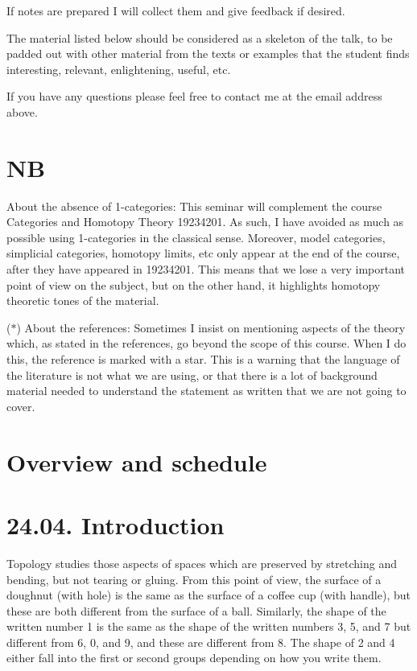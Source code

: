 \documentclass[a4paper]{amsart}
\numberwithin{figure}{section}
\theoremstyle{theorem}
\theoremstyle{definition}
\begin{document}
If notes are prepared I will collect them and give feedback if desired.

The material listed below should be considered as a skeleton of the talk, to be padded out with other material from the texts or examples that the student finds interesting, relevant, enlightening, useful, etc.

If you have any questions please feel free to contact me at the email address above.

\section*{NB}

About the absence of 1-categories: This seminar will complement the course Categories and Homotopy Theory 19234201. As such, I have avoided as much as possible using 1-categories in the classical sense. Moreover, model categories, simplicial categories, homotopy limits, etc only appear at the end of the course, after they have appeared in 19234201. This means that we lose a very important point of view on the subject, but on the other hand, it highlights homotopy theoretic tones of the material.

($*$) About the references: Sometimes I insist on mentioning aspects of the theory which, as stated in the references, go beyond the scope of this course. When I do this, the reference is marked with a star. This is a warning that the language of the literature is not what we are using, or that there is a lot of background material needed to understand the statement as written that we are not going to cover.

\section*{Overview and schedule}

\section{24.04. Introduction}

Topology studies those aspects of spaces which are preserved by stretching and bending, but not tearing or gluing. From this point of view, the surface of a doughnut (with hole) is the same as the surface of a coffee cup (with handle), but these are both different from the surface of a ball. Similarly, the shape of the written number 1 is the same as the shape of the written numbers 3, 5, and 7 but different from 6, 0, and 9, and these are different from 8. The shape of 2 and 4 either fall into the first or second groups depending on how you write them.
\end{document}
